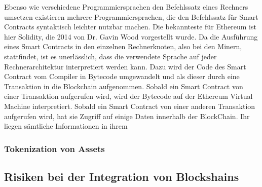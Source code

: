 Ebenso wie verschiedene Programmiersprachen den Befehlssatz eines Rechners umsetzen
existieren mehrere Programmiersprachen, die den Befehlssatz für Smart Contracts
syntaktisch leichter nutzbar machen. Die bekannteste für Ethereum ist hier Solidity,
die 2014 von Dr. Gavin Wood vorgestellt wurde. Da die Ausführung eines Smart Contracts
in den einzelnen Rechnerknoten, also bei den Minern, stattfindet, ist es unerlässlich, 
dass die verwendete Sprache auf jeder Rechnerarchitektur interpretiert werden kann.
Dazu wird der Code des Smart Contract vom Compiler in 
Bytecode umgewandelt und als dieser durch eine Transaktion in die Blockchain 
aufgenommen. %
Sobald ein Smart Contract von einer Transaktion aufgerufen wird, wird der Bytecode 
auf der Ethereum Virtual Machine interpretiert.
Sobald ein Smart Contract von einer anderen Transaktion aufgerufen wird, hat sie 
Zugriff auf einige Daten innerhalb der BlockChain. Ihr liegen sämtliche Informationen
in ihrem

\cite[p.~57ff]{fill2020blockchain}





\subsubsection{Tokenization von Assets}



\subsection{Risiken bei der Integration von Blockshains}
\cite[p.~17]{pirafelnerblockchaintechnologie}